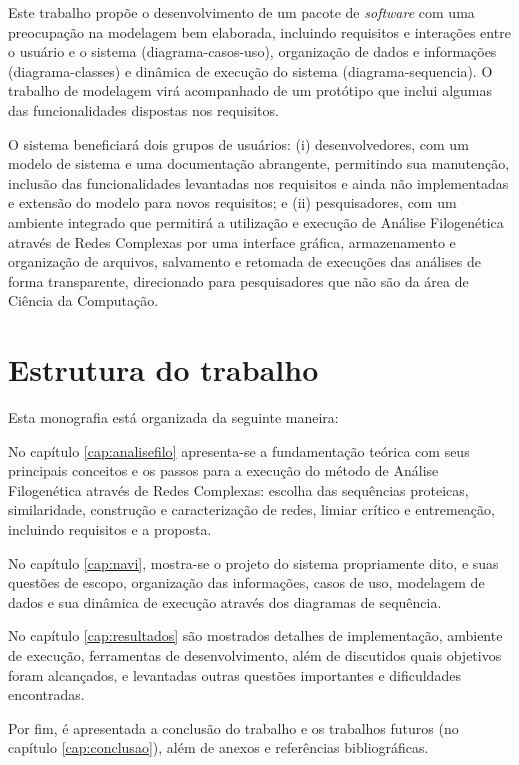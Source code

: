 
Este trabalho propõe o desenvolvimento de um pacote de \textit{software} com uma preocupação na modelagem bem elaborada, incluindo requisitos e
interações entre o usuário
e o sistema (\gls{diagrama-casos-uso}), organização de dados e informações (\gls{diagrama-classes}) e dinâmica de execução do sistema (\gls{diagrama-sequencia}).
O trabalho de modelagem virá acompanhado de um protótipo que inclui algumas das funcionalidades dispostas nos requisitos.

O sistema beneficiará dois grupos de usuários: (i) desenvolvedores, com um modelo de sistema e uma documentação abrangente, permitindo sua
manutenção, inclusão das funcionalidades levantadas nos requisitos e ainda não implementadas e extensão do modelo para novos requisitos; e (ii) pesquisadores,
com um ambiente integrado que permitirá a utilização e execução de Análise Filogenética através de Redes Complexas por uma interface gráfica,
armazenamento e organização de
arquivos, salvamento e retomada de execuções das análises de forma transparente, direcionado para pesquisadores que não são da área de Ciência da Computação.

\section{Estrutura do trabalho}

Esta monografia está organizada da seguinte maneira:

No capítulo \ref{cap:analisefilo} apresenta-se a fundamentação teórica com seus principais conceitos
e os passos para a execução do método de Análise Filogenética através de Redes Complexas: escolha das sequências proteicas,
similaridade, construção e caracterização de redes, limiar crítico e entremeação, incluindo requisitos e a proposta.

No capítulo \ref{cap:navi}, mostra-se o projeto do sistema propriamente dito, e suas questões
de escopo, organização das informações, casos de uso, modelagem de dados e sua dinâmica de execução através dos diagramas de sequência.

No capítulo \ref{cap:resultados} são mostrados detalhes de implementação, ambiente de execução, ferramentas de
desenvolvimento, além de discutidos quais objetivos foram alcançados, e levantadas outras questões importantes e dificuldades encontradas.

Por fim, é apresentada a conclusão do trabalho e os trabalhos futuros (no capítulo \ref{cap:conclusao}), além de anexos e referências bibliográficas.





